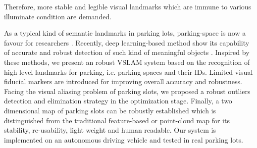 \documentclass[journal]{IEEEtran}
\begin{document}
Therefore, more stable and legible visual landmarks which are immune to various illuminate condition are demanded.

%

	
As a typical kind of semantic landmarks in parking lots, parking-space is now a favour for researchers
\citep{Houben:2015hq} \citep{Grimmett2015Integrating} \citep{Himstedt2017Online}.
Recently, deep learning-based method show its capability of  accurate and robust detection of such kind of meaningful objects \citep{zhanglin}. 
Inspired by these methods, we present an robust VSLAM system based on the recognition of high level landmarks for parking, i.e. parking-spaces and their IDs. 
Limited visual fiducial markers are introduced for improving overall accuracy and robustness. 
Facing the visual aliasing problem of parking slots, we proposed a robust outliers detection and elimination strategy in the optimization stage.
Finally, a two dimensional map of parking slots can be robustly established which is distinguished from the traditional feature-based or point-cloud map for its stability, re-usability, light weight and human readable.
Our system is implemented on an autonomous driving vehicle and tested in real parking lots.
\end{document}
